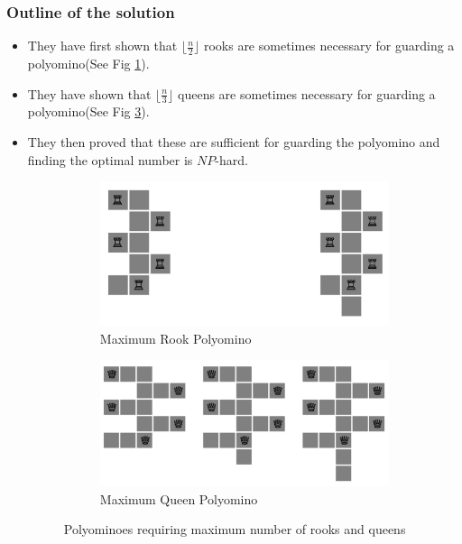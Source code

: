 \documentclass{Assignment}
\begin{document}
\subsubsection*{Outline of the solution}
\vspace{-0.3cm}
\begin{itemize}
    \itemsep-0.3em
    \item They have first shown that $\lfloor \frac n2 \rfloor$ rooks are sometimes necessary for guarding a polyomino(See Fig \ref{fig:max_rook}).
    \item They have shown that $\lfloor \frac n3 \rfloor$ queens are sometimes necessary for guarding a polyomino(See Fig \ref{fig:max_queen}).
    \item They then proved that these are sufficient for guarding the polyomino and finding the optimal number is $NP$-hard.
    \begin{figure}[H]
        \centering
        \begin{minipage}{0.45\textwidth}
            \centering
            \begin{subfigure}[b]{\textwidth}
                \centering
                \includegraphics[width=\textwidth]{images/max_rook.png}
                \caption{Maximum Rook Polyomino}
                \label{fig:max_rook}
            \end{subfigure}
        \end{minipage}
        \hfill
        \begin{minipage}{0.45\textwidth}
            \centering
            \begin{subfigure}[b]{\textwidth}
                \centering
                \includegraphics[width=\textwidth]{images/max_queen.png}
                \caption{Maximum Queen Polyomino}
                \label{fig:max_queen}
            \end{subfigure}
        \end{minipage}
        \caption{Polyominoes requiring maximum number of rooks and queens}
    \end{figure}
\end{itemize}
\end{document}
